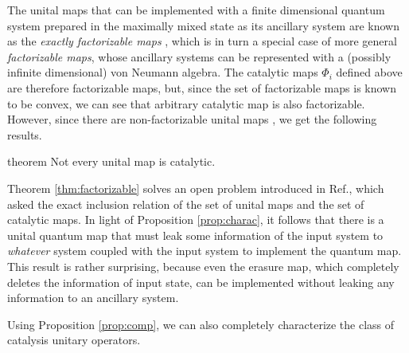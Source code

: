 \documentclass[aps, reprint, amsmath,amssymb, prx, superscriptaddress]{revtex4-2}
\begin{document}
The unital maps that can be implemented with a finite dimensional quantum system prepared in the maximally mixed state  as its ancillary system are known as the \textit{exactly factorizable maps} \cite{shor2010structure,haagerup2011factorization}, which is in turn a special case of more general \textit{factorizable maps}, whose ancillary systems can be represented with a (possibly infinite dimensional) von Neumann algebra. The catalytic maps $\Phi_i$ defined above are therefore factorizable maps, but, since the set of factorizable maps is known to be convex, we can see that arbitrary catalytic map is also factorizable. However, since there are non-factorizable unital maps \cite{haagerup2011factorization}, we get the following results.

\begin{theoremEnd}{theorem} \label{thm:factorizable}
    Not every unital map is catalytic. 
\end{theoremEnd}
Theorem \ref{thm:factorizable} solves an open problem introduced in Ref.\cite{lie2020uniform}, which asked the exact inclusion relation of the set of unital maps and the set of catalytic maps. In light of Proposition \ref{prop:charac}, it follows that there is a unital quantum map that must leak some information of the input system to \textit{whatever} system coupled with the input system to implement the quantum map. This result is rather surprising, because even the erasure map, which completely deletes the information of input state, can be implemented without leaking any information to an ancillary system.

Using Proposition \ref{prop:comp}, we can also completely characterize the class of catalysis unitary operators.
\end{document}
